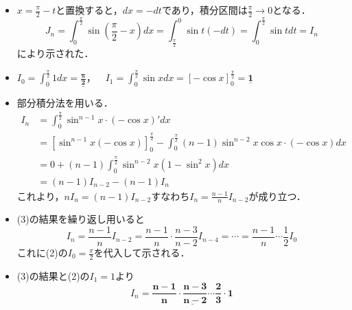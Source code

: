 \documentclass[a4paper,11pt]{ltjsarticle}
\begin{document}
\begin{itemize}
    \item [(1)]$\displaystyle{x=\frac{\pi}{2}-t}$と置換すると，$\displaystyle{dx=-dt}$であり，積分区間は$\displaystyle{\frac{\pi}{2}\to 0}$となる．
 \[J_n=\int_0^{\frac\pi2}\sin\left(\frac\pi2-x\right)dx=\int_{\frac\pi2}^0 \sin t(-dt)=\int_0^{\frac\pi2}\sin t dt=I_n\]
    により示された．
    \item [(2)]$\displaystyle{I_0=\int_0^{\frac\pi2}1dx=\underline{\boldsymbol{\frac{\pi}{2}}}}$，~~$\displaystyle{I_1=\int_0^{\frac\pi2}\sin xdx=[-\cos x]_0^{\frac\pi2}=\underline{\boldsymbol{1}}}$
    \item [(3)]部分積分法を用いる．
    \begin{align*}
        I_n&=\int_0^{\frac\pi2}\sin^{n-1}x\cdot(-\cos x)'dx\\
        &=[\sin^{n-1}x(-\cos x)]_0^{\frac\pi2}-\int_0^{\frac\pi2}(n-1)\sin^{n-2}x\cos x\cdot(-\cos x)dx\\
        &=0+(n-1)\int_0^{\frac\pi2}\sin^{n-2}x(1-\sin^2x)dx\\
        &=(n-1)I_{n-2}-(n-1)I_n
    \end{align*}
    これより，$\displaystyle{nI_n=(n-1)I_{n-2}}$すなわち$\displaystyle{I_n=\frac{n-1}{n}I_{n-2}}$が成り立つ．
    \item [(4)](3)の結果を繰り返し用いると
    \[I_n=\frac{n-1}{n}I_{n-2}=\frac{n-1}{n}\cdot\frac{n-3}{n-2}I_{n-4}=\cdots=\frac{n-1}{n}\cdots\frac{1}{2}I_0\]
    これに(2)の$\displaystyle{I_0=\frac{\pi}{2}}$を代入して示される．
    \item [(5)](3)の結果と(2)の$\displaystyle{I_1=1}$より
    \[I_n=\underline{\boldsymbol{\frac{n-1}{n}\cdot\frac{n-3}{n-2}\cdots\frac{2}{3}\cdot 1}}\]
\end{itemize}
\end{document}
